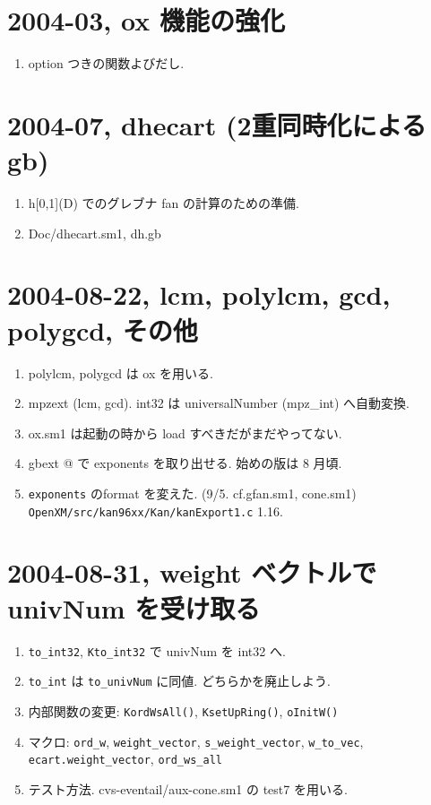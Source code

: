 \documentclass{jarticle}
\begin{document}
\section{2004-03, ox 機能の強化}
\begin{enumerate}
\item option つきの関数よびだし.
\end{enumerate}

\section{2004-07, dhecart (2重同時化による gb)}
\begin{enumerate}
\item h[0,1](D) でのグレブナ fan の計算のための準備.
\item Doc/dhecart.sm1,  dh.gb 
\end{enumerate}

\section{2004-08-22, lcm, polylcm, gcd, polygcd, その他}
\begin{enumerate}
\item polylcm, polygcd は ox を用いる.
\item mpzext (lcm, gcd).  int32 は universalNumber (mpz\_int) へ自動変換.
\item ox.sm1 は起動の時から load すべきだがまだやってない.
\item \verb@[(exponents) ...] gbext @ で exponents を取り出せる. 始めの版は 8 月頃.
\item {\tt exponents} のformat を変えた. (9/5. cf.gfan.sm1, cone.sm1) \\
{\tt OpenXM/src/kan96xx/Kan/kanExport1.c} 1.16.
\end{enumerate}

\section{2004-08-31, weight ベクトルで univNum を受け取る}
\begin{enumerate}
\item {\tt to\_int32}, {\tt Kto\_int32} で univNum を int32 へ.
\item {\tt to\_int} は {\tt to\_univNum} に同値. どちらかを廃止しよう.
\item 内部関数の変更: {\tt KordWsAll()}, {\tt KsetUpRing()}, {\tt oInitW()}
\item マクロ: {\tt ord\_w}, {\tt weight\_vector}, {\tt s\_weight\_vector},
{\tt w\_to\_vec}, {\tt ecart.weight\_vector}, {\tt ord\_ws\_all}
\item  テスト方法.  cvs-eventail/aux-cone.sm1 の test7 を用いる.
\end{enumerate}
\end{document}
